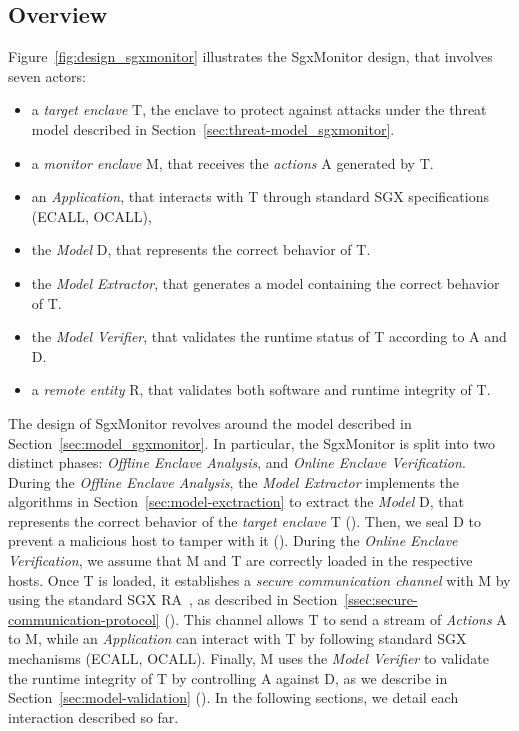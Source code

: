 \subsection{Overview}
\label{ssec:overview}
Figure~\ref{fig:design_sgxmonitor} illustrates the SgxMonitor design, that 
involves 
seven 
actors:
\begin{itemize}
	\item a \emph{target enclave} T, the enclave to protect against attacks 
	under the
	threat model described in Section~\ref{sec:threat-model_sgxmonitor}.
	\item a \emph{monitor enclave} M, that receives the \emph{actions} A 
	generated by T.
	\item an \emph{Application}, that interacts with T through standard SGX 
	specifications (\eg ECALL, OCALL),
	\item the \emph{Model} D, that represents the correct behavior of T.
	\item the \emph{Model Extractor}, that generates a model containing
	the correct behavior of T.
	\item the \emph{Model Verifier}, that validates the runtime status of T 
	according to A and D.
	\item a \emph{remote entity} R, that validates both software and runtime 
	integrity of T.
\end{itemize}

The design of SgxMonitor revolves around the model described in 
Section~\ref{sec:model_sgxmonitor}.
In particular, the SgxMonitor is split into two distinct phases: 
\emph{Offline 
	Enclave Analysis}, and \emph{Online Enclave Verification}. 
During the \emph{Offline Enclave Analysis}, the \emph{Model Extractor} 
implements the algorithms in Section~\ref{sec:model-exctraction} to extract the 
\emph{Model} D, that represents the correct behavior of the \emph{target 	
	enclave} T (\circled[1]).
Then, we seal D to prevent a malicious host to tamper with it (\circled[2]).
During the \emph{Online Enclave Verification}, we assume that M and T are 
correctly loaded in the respective hosts.
Once T is loaded, it establishes a \emph{secure communication channel} with M 
by 
using the standard SGX RA~\citep{anati2013innovative}, as
described in Section~\ref{ssec:secure-communication-protocol} (\circled[3]).
This channel allows T to send a stream of \emph{Actions} A to M, 
while an \emph{Application} can interact with T by following standard SGX 
mechanisms (\eg ECALL, OCALL).
Finally, M uses the \emph{Model Verifier} to validate the runtime integrity 
of T by controlling A against D, as we describe in 
Section~\ref{sec:model-validation} (\circled[4]).
In the following sections, we detail each interaction described so far.

